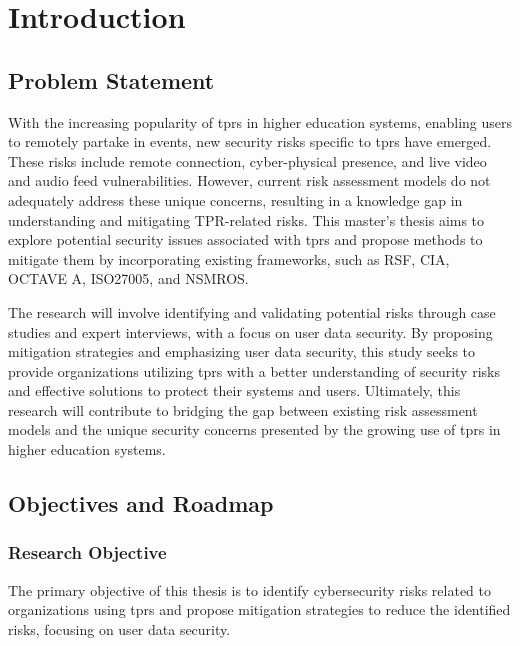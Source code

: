 \newpage


\section{Introduction}


\subsection{Problem Statement}

With the increasing popularity of \ac{tprs} in higher education systems, enabling users to remotely partake in events, new security risks specific to \ac{tprs} have emerged.
These risks include remote connection, cyber-physical presence, and live video and audio feed vulnerabilities.
However, current risk assessment models do not adequately address these unique concerns, resulting in a knowledge gap in understanding and mitigating TPR-related risks.
This master's thesis aims to explore potential security issues associated with \ac{tprs} and propose methods to mitigate them by incorporating existing frameworks, such as RSF, CIA, OCTAVE A, ISO27005, and NSMROS.

The research will involve identifying and validating potential risks through case studies and expert interviews, with a focus on user data security.
By proposing mitigation strategies and emphasizing user data security, this study seeks to provide organizations utilizing \ac{tprs} with a better understanding of security risks and effective solutions to protect their systems and users.
Ultimately, this research will contribute to bridging the gap between existing risk assessment models and the unique security concerns presented by the growing use of \ac{tprs} in higher education systems.

\subsection{Objectives and Roadmap}\label{subsec:objectives-and-roadmap}


\subsubsection{Research Objective}

The primary objective of this thesis is to identify cybersecurity risks related to organizations using \ac{tprs} and propose mitigation strategies to reduce the identified risks, focusing on user data security.

